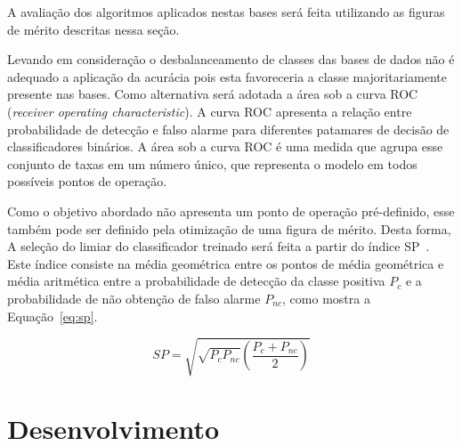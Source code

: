 A avaliação dos algoritmos aplicados nestas bases será feita utilizando as figuras
de mérito descritas nessa seção.

Levando em consideração o desbalanceamento de classes das bases de dados não é
adequado a aplicação da acurácia pois esta favoreceria a classe majoritariamente
presente nas bases.
Como alternativa será adotada a área sob a curva ROC (\textit{receiver operating
characteristic}).
A curva ROC apresenta a relação entre probabilidade de detecção e falso alarme
para diferentes patamares de decisão de classificadores binários.
A área sob a curva ROC é uma medida que agrupa esse conjunto de taxas em um
número único, que representa o modelo em todos possíveis pontos de operação.

Como o objetivo abordado não apresenta um ponto de operação pré-definido, esse
também pode ser definido pela otimização de uma figura de mérito.
Desta forma, A seleção do limiar do classificador treinado será feita a partir do
índice SP~\cite{ciodaro12}.
Este índice consiste na média geométrica entre os pontos de média geométrica e
média aritmética entre a probabilidade de detecção da classe positiva $P_c$ e a
probabilidade de não obtenção de falso alarme $P_{nc}$, como mostra a
Equação~\ref{eq:sp}.

\begin{equation} \label{eq:sp}
    SP = \sqrt{\sqrt{P_c P_{nc}} \left(\frac{P_c + P_{nc}}{2}\right)}
\end{equation}

\section{Desenvolvimento}

